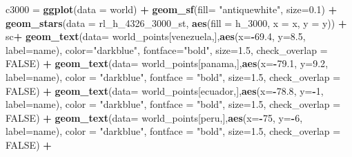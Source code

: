 \documentclass[12pt,oneside]{reedthesis}
\newenvironment{Shaded}{\begin{snugshade}}{\end{snugshade}}
\newcommand{\DataTypeTok}[1]{\textcolor[rgb]{0.13,0.29,0.53}{#1}}
\newcommand{\DecValTok}[1]{\textcolor[rgb]{0.00,0.00,0.81}{#1}}
\newcommand{\FloatTok}[1]{\textcolor[rgb]{0.00,0.00,0.81}{#1}}
\newcommand{\KeywordTok}[1]{\textcolor[rgb]{0.13,0.29,0.53}{\textbf{#1}}}
\newcommand{\NormalTok}[1]{#1}
\newcommand{\OperatorTok}[1]{\textcolor[rgb]{0.81,0.36,0.00}{\textbf{#1}}}
\newcommand{\OtherTok}[1]{\textcolor[rgb]{0.56,0.35,0.01}{#1}}
\newcommand{\StringTok}[1]{\textcolor[rgb]{0.31,0.60,0.02}{#1}}
\begin{document}
\begin{Shaded}
\begin{Highlighting}[]
\NormalTok{c3000 =}\StringTok{ }\KeywordTok{ggplot}\NormalTok{(}\DataTypeTok{data =}\NormalTok{ world) }\OperatorTok{+}\StringTok{ }
\StringTok{  }\KeywordTok{geom_sf}\NormalTok{(}\DataTypeTok{fill=} \StringTok{"antiquewhite"}\NormalTok{, }\DataTypeTok{size=}\FloatTok{0.1}\NormalTok{) }\OperatorTok{+}\StringTok{ }
\StringTok{  }\KeywordTok{geom_stars}\NormalTok{(}\DataTypeTok{data =}\NormalTok{ rl_h_}\DecValTok{4326}\NormalTok{_}\DecValTok{3000}\NormalTok{_st, }\KeywordTok{aes}\NormalTok{(}\DataTypeTok{fill =}\NormalTok{ h_}\DecValTok{3000}\NormalTok{, }\DataTypeTok{x =}\NormalTok{ x, }\DataTypeTok{y =}\NormalTok{ y)) }\OperatorTok{+}\StringTok{ }
\StringTok{  }\NormalTok{sc}\OperatorTok{+}
\StringTok{  }\KeywordTok{geom_text}\NormalTok{(}\DataTypeTok{data=}\NormalTok{ world_points[venezuela,],}\KeywordTok{aes}\NormalTok{(}\DataTypeTok{x=}\OperatorTok{-}\FloatTok{69.4}\NormalTok{, }\DataTypeTok{y=}\FloatTok{8.5}\NormalTok{, }\DataTypeTok{label=}\NormalTok{name), }\DataTypeTok{color=}\StringTok{"darkblue"}\NormalTok{, }\DataTypeTok{fontface=}\StringTok{"bold"}\NormalTok{, }\DataTypeTok{size=}\FloatTok{1.5}\NormalTok{, }\DataTypeTok{check_overlap =} \OtherTok{FALSE}\NormalTok{) }\OperatorTok{+}
\StringTok{  }\KeywordTok{geom_text}\NormalTok{(}\DataTypeTok{data=}\NormalTok{ world_points[panama,],}\KeywordTok{aes}\NormalTok{(}\DataTypeTok{x=}\OperatorTok{-}\FloatTok{79.1}\NormalTok{, }\DataTypeTok{y=}\FloatTok{9.2}\NormalTok{, }\DataTypeTok{label=}\NormalTok{name), }\DataTypeTok{color =} \StringTok{"darkblue"}\NormalTok{, }\DataTypeTok{fontface =} \StringTok{"bold"}\NormalTok{, }\DataTypeTok{size=}\FloatTok{1.5}\NormalTok{, }\DataTypeTok{check_overlap =} \OtherTok{FALSE}\NormalTok{) }\OperatorTok{+}\StringTok{ }
\StringTok{  }\KeywordTok{geom_text}\NormalTok{(}\DataTypeTok{data=}\NormalTok{ world_points[ecuador,],}\KeywordTok{aes}\NormalTok{(}\DataTypeTok{x=}\OperatorTok{-}\FloatTok{78.8}\NormalTok{, }\DataTypeTok{y=}\OperatorTok{-}\DecValTok{1}\NormalTok{, }\DataTypeTok{label=}\NormalTok{name), }\DataTypeTok{color =} \StringTok{"darkblue"}\NormalTok{, }\DataTypeTok{fontface =} \StringTok{"bold"}\NormalTok{, }\DataTypeTok{size=}\FloatTok{1.5}\NormalTok{, }\DataTypeTok{check_overlap =} \OtherTok{FALSE}\NormalTok{) }\OperatorTok{+}
\StringTok{  }\KeywordTok{geom_text}\NormalTok{(}\DataTypeTok{data=}\NormalTok{ world_points[peru,],}\KeywordTok{aes}\NormalTok{(}\DataTypeTok{x=}\OperatorTok{-}\DecValTok{75}\NormalTok{, }\DataTypeTok{y=}\OperatorTok{-}\DecValTok{6}\NormalTok{, }\DataTypeTok{label=}\NormalTok{name), }\DataTypeTok{color =} \StringTok{"darkblue"}\NormalTok{, }\DataTypeTok{fontface =} \StringTok{"bold"}\NormalTok{, }\DataTypeTok{size=}\FloatTok{1.5}\NormalTok{, }\DataTypeTok{check_overlap =} \OtherTok{FALSE}\NormalTok{) }\OperatorTok{+}

\end{Highlighting}
\end{Shaded}
\end{document}
